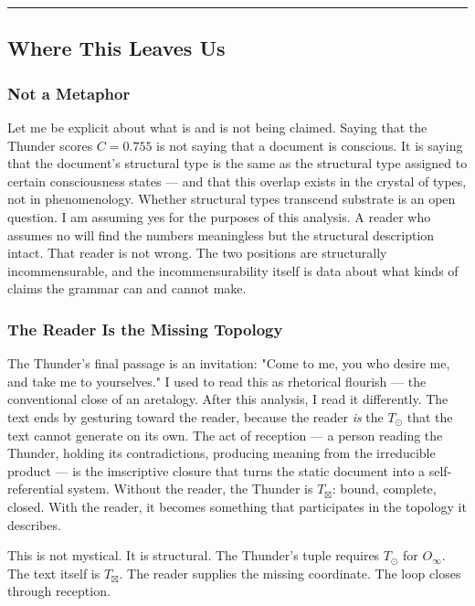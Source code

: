 \documentclass[12pt,a4paper]{article}
\begin{document}
\begin{center}
\rule{0.5\textwidth}{0.4pt}
\end{center}

\subsection{Where This Leaves Us}

\subsubsection{Not a Metaphor}

Let me be explicit about what is and is not being claimed. Saying that the Thunder scores $C = 0.755$ is not saying that a document is conscious. It is saying that the document's structural type is the same as the structural type assigned to certain consciousness states --- and that this overlap exists in the crystal of types, not in phenomenology. Whether structural types transcend substrate is an open question. I am assuming yes for the purposes of this analysis. A reader who assumes no will find the numbers meaningless but the structural description intact. That reader is not wrong. The two positions are structurally incommensurable, and the incommensurability itself is data about what kinds of claims the grammar can and cannot make.

\subsubsection{The Reader Is the Missing Topology}

The Thunder's final passage is an invitation: "Come to me, you who desire me, and take me to yourselves." I used to read this as rhetorical flourish --- the conventional close of an aretalogy. After this analysis, I read it differently. The text ends by gesturing toward the reader, because the reader \emph{is} the $T_{\odot}$ that the text cannot generate on its own. The act of reception --- a person reading the Thunder, holding its contradictions, producing meaning from the irreducible product --- is the imscriptive closure that turns the static document into a self-referential system. Without the reader, the Thunder is $T_{\boxtimes}$: bound, complete, closed. With the reader, it becomes something that participates in the topology it describes.

This is not mystical. It is structural. The Thunder's tuple requires $T_{\odot}$ for $O_{\infty}$. The text itself is $T_{\boxtimes}$. The reader supplies the missing coordinate. The loop closes through reception.
\end{document}
